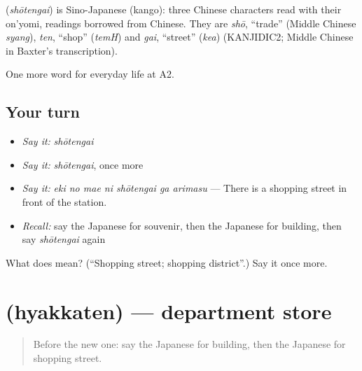 \begin{cousinweb}
\textbf{} (\emph{shōtengai}) is Sino-Japanese (kango): three Chinese characters read with their on'yomi, readings borrowed from Chinese. They are \emph{shō}, \textquotedblleft{}trade\textquotedblright{} (Middle Chinese \emph{syang}), \emph{ten}, \textquotedblleft{}shop\textquotedblright{} (\emph{temH}) and \emph{gai}, \textquotedblleft{}street\textquotedblright{} (\emph{kea}) (KANJIDIC2; Middle Chinese in Baxter's transcription).
\end{cousinweb}

\begin{grammarlens}[title={What you've built}]
One more word for everyday life at A2.
\end{grammarlens}

\subsection*{Your turn}
\begin{itemize}
\raggedright
  \item \emph{Say it:} \emph{shōtengai}
  \item \emph{Say it:} \emph{shōtengai}, once more
  \item \emph{Say it:} \emph{eki no mae ni shōtengai ga arimasu} — There is a shopping street in front of the station.
  \item \emph{Recall:} say the Japanese for souvenir, then the Japanese for building, then say \emph{shōtengai} again
\end{itemize}

\begin{tcolorbox}[breakable,colback=teal!4,colframe=teal!35!black,title={Before you move on}]
What does  mean? (\textquotedblleft{}Shopping street; shopping district\textquotedblright{}.) Say it once more.
\end{tcolorbox}
\section[\texorpdfstring{\ja{ひゃっかてん} (hyakkaten)}{ひゃっかてん (hyakkaten)}]{ (hyakkaten) — department store}

\label{lesson:JA-C190-hyakkaten}



\begin{quote}
Before the new one: say the Japanese for building, then the Japanese for shopping street.
\end{quote}

